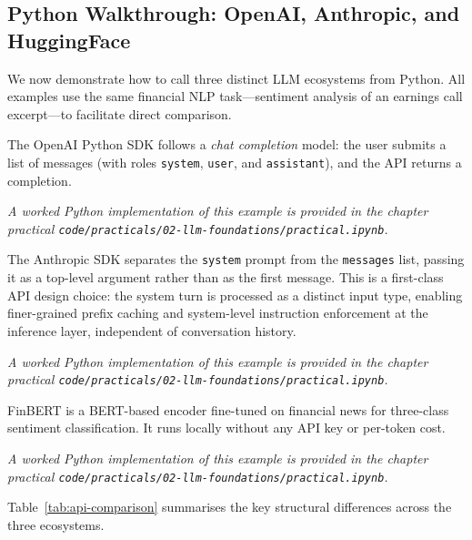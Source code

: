 \begin{context}
\subsection{Python Walkthrough: OpenAI, Anthropic, and HuggingFace}
\label{sec:api-python}

We now demonstrate how to call three distinct LLM ecosystems from Python.  All
examples use the same financial NLP task---sentiment analysis of an earnings call
excerpt---to facilitate direct comparison.

The OpenAI Python SDK follows a \emph{chat completion} model: the user submits a list
of messages (with roles \texttt{system}, \texttt{user}, and \texttt{assistant}), and
the API returns a completion.

\textit{A worked Python implementation of this example is provided in the chapter practical \texttt{code/practicals/02-llm-foundations/practical.ipynb}.}

The Anthropic SDK separates the \texttt{system} prompt from the \texttt{messages}
list, passing it as a top-level argument rather than as the first message.  This
is a first-class API design choice: the system turn is processed as a distinct
input type, enabling finer-grained prefix caching and system-level instruction
enforcement at the inference layer, independent of conversation history.

\textit{A worked Python implementation of this example is provided in the chapter practical \texttt{code/practicals/02-llm-foundations/practical.ipynb}.}

FinBERT \cite{araci2019finbert} %
is a BERT-based encoder fine-tuned on financial news for three-class sentiment
classification.  It runs locally without any API key or per-token cost.

\textit{A worked Python implementation of this example is provided in the chapter practical \texttt{code/practicals/02-llm-foundations/practical.ipynb}.}

Table~\ref{tab:api-comparison} summarises the key structural differences across the three ecosystems.


\end{context}
